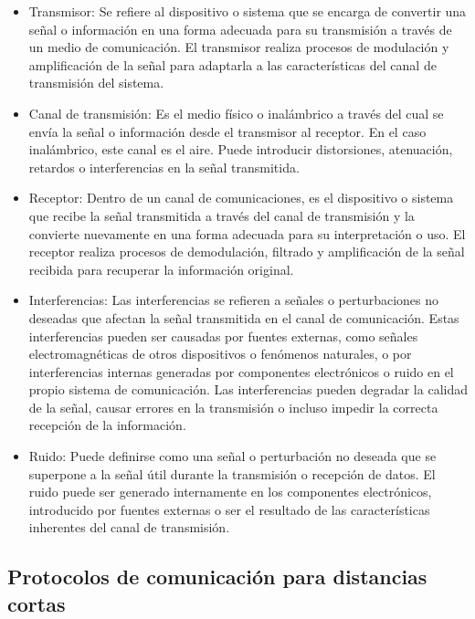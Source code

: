 \begin{itemize}
    \item Transmisor: Se refiere al dispositivo o sistema que se encarga de convertir una señal o información en una forma adecuada para su transmisión a través de un medio de comunicación. El transmisor realiza procesos de modulación y amplificación de la señal para adaptarla a las características del canal de transmisión del sistema.

    \item Canal de transmisión: Es el medio físico o inalámbrico a través del cual se envía la señal o información desde el transmisor al receptor. En el caso inalámbrico, este canal es el aire. Puede introducir distorsiones, atenuación, retardos o interferencias en la señal transmitida.

    \item Receptor: Dentro de un canal de comunicaciones, es el dispositivo o sistema que recibe la señal transmitida a través del canal de transmisión y la convierte nuevamente en una forma adecuada para su interpretación o uso. El receptor realiza procesos de demodulación, filtrado y amplificación de la señal recibida para recuperar la información original.

    \item Interferencias: Las interferencias se refieren a señales o perturbaciones no deseadas que afectan la señal transmitida en el canal de comunicación. Estas interferencias pueden ser causadas por fuentes externas, como señales electromagnéticas de otros dispositivos o fenómenos naturales, o por interferencias internas generadas por componentes electrónicos o ruido en el propio sistema de comunicación. Las interferencias pueden degradar la calidad de la señal, causar errores en la transmisión o incluso impedir la correcta recepción de la información.

    \item Ruido: Puede definirse como una señal o perturbación no deseada que se superpone a la señal útil durante la transmisión o recepción de datos. El ruido puede ser generado internamente en los componentes electrónicos, introducido por fuentes externas o ser el resultado de las características inherentes del canal de transmisión. 

\end{itemize}

\subsection{Protocolos de comunicación para distancias cortas}

